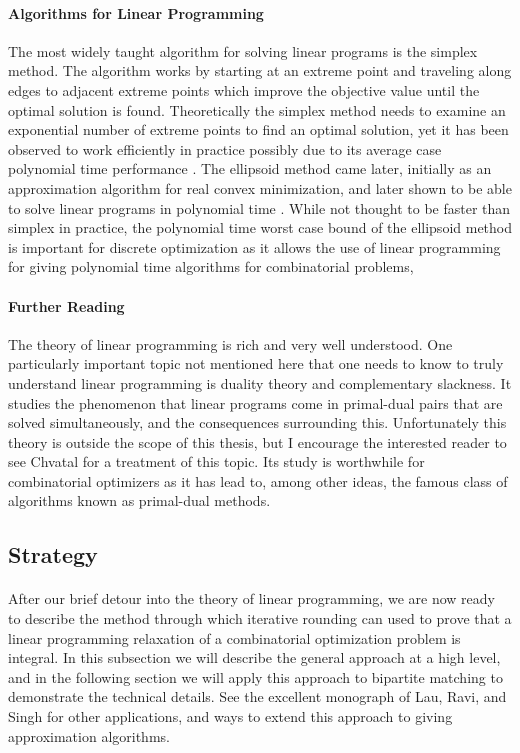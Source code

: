 \paragraph{Algorithms for Linear Programming}
The most widely taught algorithm for solving linear programs is the simplex method\cite{dantzig1955generalized}. The algorithm works by starting at an extreme point and traveling along edges to adjacent extreme points which improve the objective value until the optimal solution is found. Theoretically the simplex method needs to examine an exponential number of extreme points to find an optimal solution, yet it has been observed to work efficiently in practice possibly due to its average case polynomial time performance \cite{smale1983average}. The ellipsoid method came later, initially as an approximation algorithm for real convex minimization, and later shown to be able to solve linear programs in polynomial time \cite{grotschel1981ellipsoid}. While not thought to be faster than simplex in practice, the polynomial time worst case bound of the ellipsoid method is important for discrete optimization as it allows the use of linear programming for giving polynomial time algorithms for combinatorial problems,
\paragraph{Further Reading}
The theory of linear programming is rich and very well understood. One particularly important topic not mentioned here that one needs to know to truly understand linear programming is duality theory and complementary slackness. It studies the phenomenon that linear programs come in primal-dual pairs that are solved simultaneously, and the consequences surrounding this. Unfortunately this theory is outside the scope of this thesis, but I encourage the interested reader to see Chvatal \cite{chvatal1983linear} for a treatment of this topic. Its study is worthwhile for combinatorial optimizers as it has lead to, among other ideas, the famous class of algorithms known as primal-dual methods.
\subsection{Strategy}
\paragraph{}
After our brief detour into the theory of linear programming, we are now ready to describe the method through which iterative rounding can used to prove that a linear programming relaxation of a combinatorial optimization problem is integral. In this subsection we will describe the general approach at a high level, and in the following section we will apply this approach to bipartite matching to demonstrate the technical details. See the excellent monograph of Lau, Ravi, and Singh\cite{lau2011iterative} for other applications, and ways to extend this approach to giving approximation algorithms.
